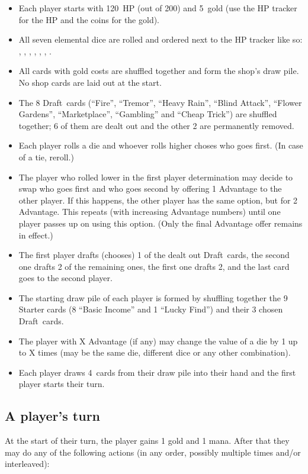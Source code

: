 \documentclass[dvipsnames,parskip,a4paper]{scrartcl}
\newcommand{\iconsize}{3.4mm}
\newcommand{\icondepth}{0.45mm}
\newcommand{\icon}[1]{\raisebox{-\icondepth}{\texttt{[image:  \#1 ]}}}
\newcommand{\fire}{\icon{icons/fire.png}}
\newcommand{\earth}{\icon{icons/earth.png}}
\newcommand{\water}{\icon{icons/water.png}}
\newcommand{\nature}{\icon{icons/nature.png}}
\newcommand{\magic}{\icon{icons/magic.png}}
\newcommand{\gold}{\icon{icons/gold.png}}
\newcommand{\chance}{\icon{icons/chance.png}}
\newcommand{\draft}{Draft}
\newcommand{\startgold}{5}
\newcommand{\handsize}{4}
\newcommand{\starthp}{120}
\begin{document}
\begin{itemize}
\item Each player starts with \starthp \ HP (out of 200) and \startgold \ gold (use the HP tracker for the HP and the coins for the gold).
\item All seven elemental dice are rolled and ordered next to the HP tracker like so: \fire, \earth, \water, \nature, \gold, \magic, \chance.
\item All cards with gold costs are shuffled together and form the shop's draw pile. No shop cards are laid out at the start.
\item The 8 \draft \ cards (``Fire'', ``Tremor'', ``Heavy Rain'', ``Blind Attack'', ``Flower Gardens'', ``Marketplace'', ``Gambling'' and ``Cheap Trick'') are shuffled together; 6 of them are dealt out and the other 2 are permanently removed.
\item Each player rolls a die and whoever rolls higher choses who goes first. (In case of a tie, reroll.)
\item The player who rolled lower in the first player determination may decide to swap who goes first and who goes second by offering 1 Advantage to the other player. If this happens, the other player has the same option, but for 2 Advantage. This repeats (with increasing Advantage numbers) until one player passes up on using this option. (Only the final Advantage offer remains in effect.)
\item The first player drafts (chooses) 1 of the dealt out \draft \ cards, the second one drafts 2 of the remaining ones, the first one drafts 2, and the last card goes to the second player.
\item The starting draw pile of each player is formed by shuffling together the 9 Starter cards (8 ``Basic Income'' and 1 ``Lucky Find'') and their 3 chosen \draft \ cards.
\item The player with X Advantage (if any) may change the value of a die by 1 up to X times (may be the same die, different dice or any other combination).
\item Each player draws \handsize \ cards from their draw pile into their hand and the first player starts their turn.
\end{itemize}

\subsection*{A player's turn}

At the start of their turn, the player gains 1 gold and 1 mana. After that they may do any of the following actions (in any order, possibly multiple times and/or interleaved):
\end{document}
